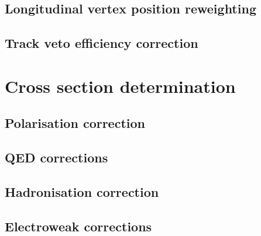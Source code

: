 

 \section{Longitudinal vertex position reweighting}
 
 
 \section{Track veto efficiency correction}
 
 
 \chapter{Cross section determination}
 
 
 \section{Polarisation correction}
 
 
 \section{QED corrections}
 
 \section{Hadronisation correction}
 
 \section{Electroweak corrections}
 
 
% 
